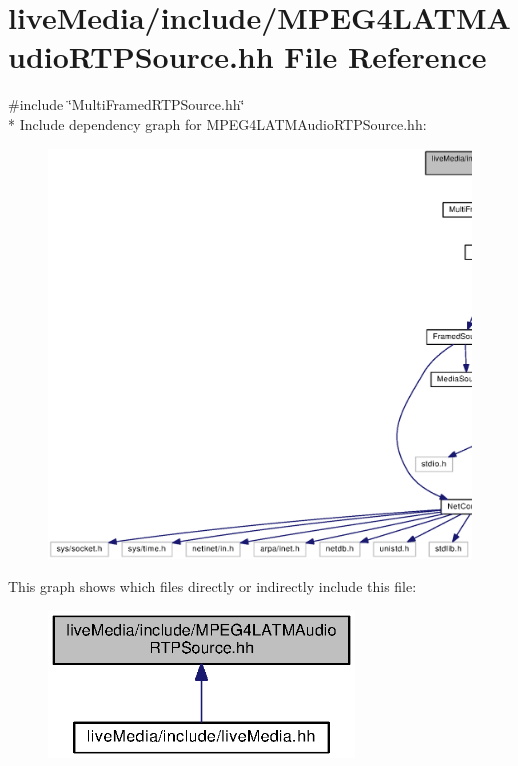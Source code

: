 \section{live\+Media/include/\+M\+P\+E\+G4\+L\+A\+T\+M\+Audio\+R\+T\+P\+Source.hh File Reference}
\label{MPEG4LATMAudioRTPSource_8hh}
{\ttfamily \#include \char`\"{}Multi\+Framed\+R\+T\+P\+Source.\+hh\char`\"{}}\\*
Include dependency graph for M\+P\+E\+G4\+L\+A\+T\+M\+Audio\+R\+T\+P\+Source.\+hh\+:
\nopagebreak
\begin{figure}[H]
\begin{center}
\leavevmode
\includegraphics[width=350pt]{MPEG4LATMAudioRTPSource_8hh__incl}
\end{center}
\end{figure}
This graph shows which files directly or indirectly include this file\+:
\nopagebreak
\begin{figure}[H]
\begin{center}
\leavevmode
\includegraphics[width=230pt]{MPEG4LATMAudioRTPSource_8hh__dep__incl}
\end{center}
\end{figure}
